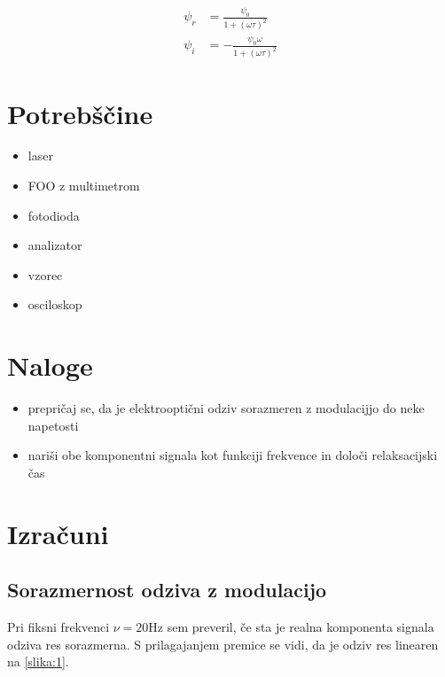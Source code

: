 \documentclass[11pt]{article}
\renewcommand{%
  \refname}{Viri}
\begin{document}
\begin{align}\label{al:1}
  \psi_r &= \frac{\psi_0}{1 + (\omega \tau ) ^2} \\
\psi_i &= - \frac{\psi_0 \omega}{1 + (\omega \tau)^2}
\end{align}
\clearpage
\section{Potrebščine}\label{sec:orgb767dad}

\begin{itemize}
\item laser
\item FOO z multimetrom
\item fotodioda
\item analizator
\item vzorec
\item osciloskop
\end{itemize}
\section{Naloge}\label{sec:org943583a}

\begin{itemize}
\item prepričaj se, da je elektrooptični odziv sorazmeren z modulacijjo do neke napetosti
\item nariši obe komponentni signala kot funkciji frekvence in določi relaksacijski čas

\end{itemize}
\section{Izračuni}\label{sec:org6a1e141}
\subsection{Sorazmernost odziva z modulacijo}\label{sec:org3793a0c}

Pri fiksni frekvenci \(\nu = 20 \mathrm{Hz}\) sem preveril, če sta je realna komponenta signala odziva res sorazmerna. S prilagajanjem premice se vidi, da je odziv res linearen na \ref{slika:1}.
\end{document}
